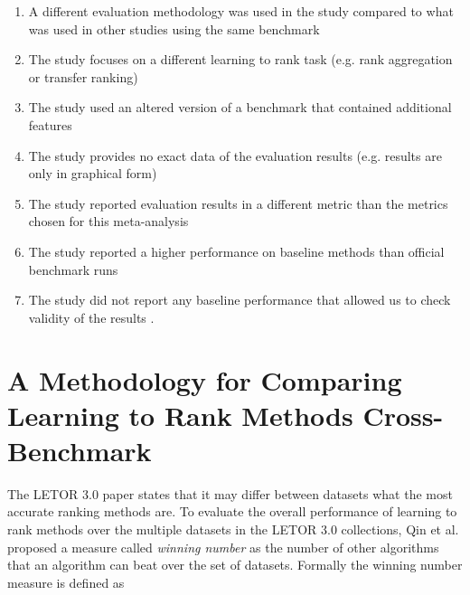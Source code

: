 \documentclass{sig-alternate-2013}
\begin{document}
\begin{enumerate}
\item A different evaluation methodology was used in the study compared to what was used in other studies using the same benchmark \cite{Geng2011, Lin2012}
\item The study focuses on a different learning to rank task (e.g. rank aggregation or transfer ranking) \cite{De2011, De2010, Derhami2013, De2012, Chen2010, Ah-Pine2008, Wang2009c, De2013, Miao2013, Hoi2008, De2012b, Duh2011b, Argentini2012, Qin2010c, Volkovs2013, Desarkar2011, Pan2013, Lin2011b, Volkovs2012, Dammak2011}
\item The study used an altered version of a benchmark that contained additional features \cite{Bidoki2009, Ding2010}
\item The study provides no exact data of the evaluation results (e.g. results are only in graphical form) \cite{Wang2008, Wang2010, Xu2010, Kuo2009, Li2008, Xia2008, Zhou2011, Wu2011, Zhu2009, Karimzadehgan2011, Swersky2012, Pan2011, Ni2008, Ciaramita2008, Stewart2012, Petterson2009, Agarwal2010, Chang2009, Qin2008c, Adams2011, Sculley2009, Huang2008, Alejo2010, Sun2011, He2010b, Benbouzid2012, Geng2012, Chen2012, Xu2012, Shivaswamy2011}
\item The study reported evaluation results in a different metric than the metrics chosen for this meta-analysis \cite{Yu2009, Thuy2009, Pahikkala2009, Kersting2009, Mohan2011}
\item The study reported a higher performance on baseline methods than official benchmark runs \cite{Dubey2009, Banerjee2009, Peng2010b, Song2014, Bian2010, Bian2010b, Carvalho2008, Acharyya2012, Peng2010b, Tran2012, Asadi2013c}
\item The study did not report any baseline performance that allowed us to check validity of the results \cite{Chakrabarti2008, Wang2012b, Buffoni2011}.
\end{enumerate}

\section{A Methodology for Comparing Learning to Rank Methods Cross-Benchmark}
The LETOR 3.0 paper \cite{Qin2010} states that it may differ between datasets what the most accurate ranking methods are. To evaluate the overall performance of learning to rank methods over the multiple datasets in the LETOR 3.0 collections, Qin et al. \cite{Qin2010} proposed a measure called \emph{winning number} as the number of other algorithms that an algorithm can beat over the set of datasets. Formally the winning number measure is defined as\\
\end{document}
